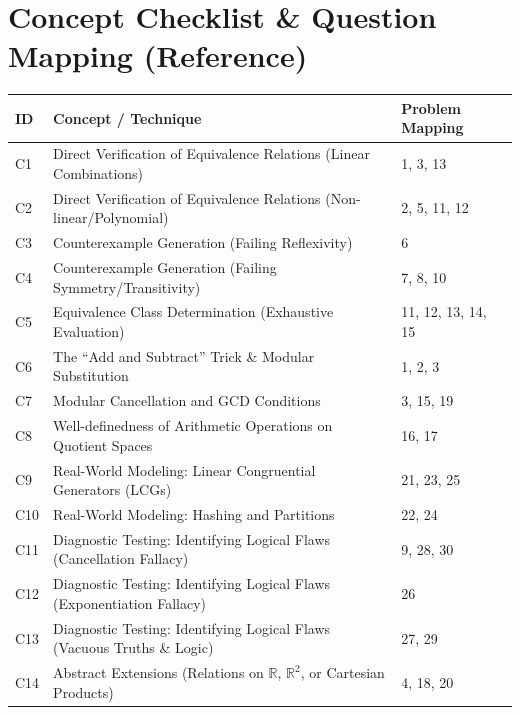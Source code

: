 \documentclass[11pt, a4paper]{article}
\theoremstyle{definition}
\theoremstyle{remark}
\newcommand{\R}{\mathbb{R}}
\begin{document}
\newpage

\section{Concept Checklist \& Question Mapping (Reference)}

\renewcommand{\arraystretch}{1.5}
\noindent
\begin{tabularx}{\textwidth}{l X l}
\toprule
\textbf{ID} & \textbf{Concept / Technique} & \textbf{Problem Mapping} \\
\midrule
C1 & Direct Verification of Equivalence Relations (Linear Combinations) & 1, 3, 13 \\
C2 & Direct Verification of Equivalence Relations (Non-linear/Polynomial) & 2, 5, 11, 12 \\
C3 & Counterexample Generation (Failing Reflexivity) & 6 \\
C4 & Counterexample Generation (Failing Symmetry/Transitivity) & 7, 8, 10 \\
C5 & Equivalence Class Determination (Exhaustive Evaluation) & 11, 12, 13, 14, 15 \\
C6 & The ``Add and Subtract'' Trick \& Modular Substitution & 1, 2, 3 \\
C7 & Modular Cancellation and GCD Conditions & 3, 15, 19 \\
C8 & Well-definedness of Arithmetic Operations on Quotient Spaces & 16, 17 \\
C9 & Real-World Modeling: Linear Congruential Generators (LCGs) & 21, 23, 25 \\
C10 & Real-World Modeling: Hashing and Partitions & 22, 24 \\
C11 & Diagnostic Testing: Identifying Logical Flaws (Cancellation Fallacy) & 9, 28, 30 \\
C12 & Diagnostic Testing: Identifying Logical Flaws (Exponentiation Fallacy) & 26 \\
C13 & Diagnostic Testing: Identifying Logical Flaws (Vacuous Truths \& Logic) & 27, 29 \\
C14 & Abstract Extensions (Relations on $\R$, $\R^2$, or Cartesian Products) & 4, 18, 20 \\
\bottomrule
\end{tabularx}
\end{document}
